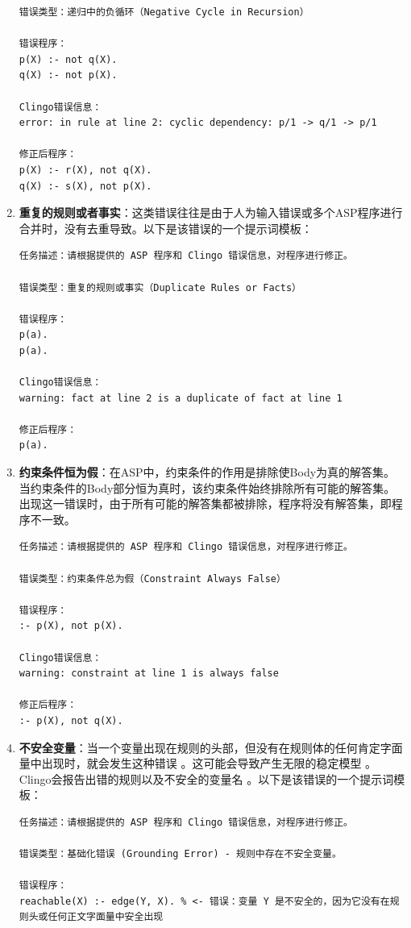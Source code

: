 \begin{enumerate}[itemsep=0pt,parsep=0pt]
\begin{lstlisting}
错误类型：​递归中的负循环（Negative Cycle in Recursion）​

错误程序：
p(X) :- not q(X).
q(X) :- not p(X).

Clingo错误信息：
error: in rule at line 2: cyclic dependency: p/1 -> q/1 -> p/1

修正后程序：
p(X) :- r(X), not q(X).
q(X) :- s(X), not p(X).
\end{lstlisting}
\item \textbf{重复的规则或者事实}：这类错误往往是由于人为输入错误或多个ASP程序进行合并时，没有去重导致。以下是该错误的一个提示词模板：
\begin{lstlisting}
任务描述：请根据提供的 ASP 程序和 Clingo 错误信息，对程序进行修正。

错误类型：​重复的规则或事实（Duplicate Rules or Facts）​

错误程序：
p(a).
p(a).

Clingo错误信息：
warning: fact at line 2 is a duplicate of fact at line 1

修正后程序：
p(a).
\end{lstlisting}
\item \textbf{约束条件恒为假}：在ASP中，约束条件的作用是排除使Body为真的解答集。
当约束条件的Body部分恒为真时，该约束条件始终排除所有可能的解答集。出现这一错误时，由于所有可能的解答集都被排除，程序将没有解答集，即程序不一致。
\begin{lstlisting}
任务描述：请根据提供的 ASP 程序和 Clingo 错误信息，对程序进行修正。

错误类型：​约束条件总为假（Constraint Always False）

错误程序：
:- p(X), not p(X).

Clingo错误信息：
warning: constraint at line 1 is always false

修正后程序：
:- p(X), not q(X).
\end{lstlisting}
\item \textbf{不安全变量}：当一个变量出现在规则的头部，但没有在规则体的任何肯定字面量中出现时，就会发生这种错误 。这可能会导致产生无限的稳定模型 。Clingo会报告出错的规则以及不安全的变量名 。以下是该错误的一个提示词模板：
\begin{lstlisting}
任务描述：请根据提供的 ASP 程序和 Clingo 错误信息，对程序进行修正。

错误类型：基础化错误 (Grounding Error) - 规则中存在不安全变量。

错误程序：
reachable(X) :- edge(Y, X). % <- 错误：变量 Y 是不安全的，因为它没有在规则头或任何正文字面量中安全出现


\end{lstlisting}
\end{enumerate}
